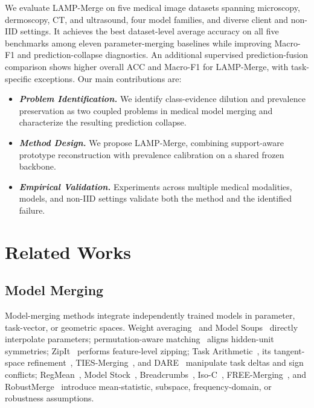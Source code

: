\documentclass[journal,twoside,web]{ieeecolor}
\begin{document}
We evaluate LAMP-Merge on five medical image datasets spanning microscopy, dermoscopy, CT, and ultrasound, four model families, and diverse client and non-IID settings. It achieves the best dataset-level average accuracy on all five benchmarks among eleven parameter-merging baselines while improving Macro-F1 and prediction-collapse diagnostics. An additional supervised prediction-fusion comparison shows higher overall ACC and Macro-F1 for LAMP-Merge, with task-specific exceptions. Our main contributions are:
\begin{itemize}[leftmargin=*]
    \item[\ding{182}] \textbf{\textit{Problem Identification.}}
    We identify class-evidence dilution and prevalence preservation as two coupled problems in medical model merging and characterize the resulting prediction collapse.
    \item[\ding{183}] \textbf{\textit{Method Design.}}
    We propose LAMP-Merge, combining support-aware prototype reconstruction with prevalence calibration on a shared frozen backbone.
    \item[\ding{184}] \textbf{\textit{Empirical Validation.}}
    Experiments across multiple medical modalities, models, and non-IID settings validate both the method and the identified failure.
\end{itemize}

\section{Related Works}

\subsection{Model Merging}

Model-merging methods integrate independently trained models in parameter, task-vector, or geometric spaces. Weight averaging~\cite{izmailov2018averaging} and Model Soups~\cite{pmlr-v162-wortsman22a} directly interpolate parameters; permutation-aware matching~\cite{entezari2022role} aligns hidden-unit symmetries; ZipIt~\cite{stoica2024zipit} performs feature-level zipping; Task Arithmetic~\cite{ilharco2023editingmodelstaskarithmetic}, its tangent-space refinement~\cite{ortizjimenez2023tangent}, TIES-Merging~\cite{yadav2023tiesmergingresolvinginterferencemerging}, and DARE~\cite{yu2024languagemodelssupermario} manipulate task deltas and sign conflicts; RegMean~\cite{jin2025datalessknowledgefusionmerging}, Model Stock~\cite{jang2025modelstockneedjust}, Breadcrumbs~\cite{davari2024modelbreadcrumbsscalingmultitask}, Iso-C~\cite{marczak2025taskleftbehindisotropic}, FREE-Merging~\cite{zheng2025freemergingfouriertransformefficient}, and RobustMerge~\cite{zeng2025robustmergeparameterefficientmodelmerging} introduce  mean-statistic, subspace, frequency-domain, or robustness assumptions.
\end{document}
